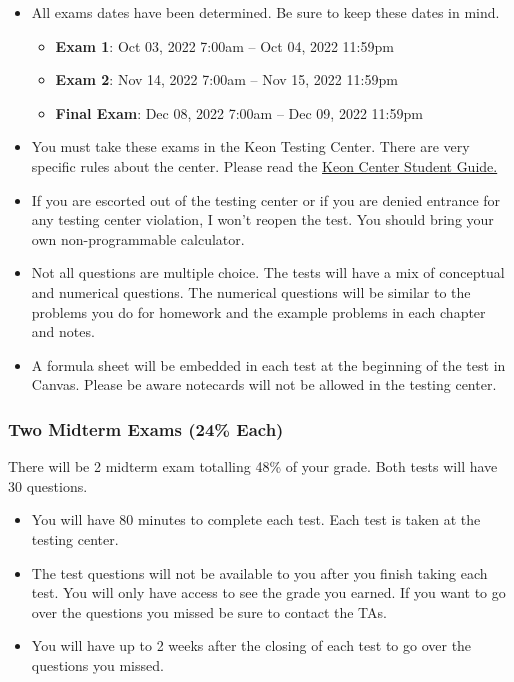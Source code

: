 \documentclass[11pt]{paper}
\begin{document}
\begin{itemize}

\item All exams dates have been determined. Be sure to keep these dates in mind.

\begin{itemize}
  \item \textbf{Exam 1}: Oct 03, 2022 7:00am -- Oct 04, 2022 11:59pm
  \item \textbf{Exam 2}: Nov 14, 2022 7:00am -- Nov 15, 2022 11:59pm
  \item \textbf{Final Exam}: Dec 08, 2022 7:00am -- Dec 09, 2022 11:59pm
\end{itemize}

\item You must take these exams in the Keon Testing Center. There are very specific rules about the center. Please read the \href{https://business.ucf.edu/centers-institutes/keon-testing-center/ktc-student-guide/}{Keon Center Student Guide.}

\item If you are escorted out of the testing center or if you are denied entrance for any testing center violation, I won’t reopen the test. You should bring your own non-programmable calculator.

\item Not all questions are multiple choice. The tests will have a mix of conceptual and numerical questions. The numerical questions will be similar to the problems you do for homework and the example problems in each chapter and notes. 

\item A formula sheet will be embedded in each test at the beginning of the test in Canvas. Please be aware notecards will not be allowed in the testing center.

\end{itemize}

\subsubsection{Two Midterm Exams (24\% Each)}

There will be 2 midterm exam totalling 48\% of your grade. Both tests will have 30 questions. 

\begin{itemize}
\item You will have 80 minutes to complete each test. Each test is taken at the testing center.
\item The test questions will not be available to you after you finish taking each test. You will only have access to see the grade you earned. If you want to go over the questions you missed be sure to contact the TAs.
\item You will have up to 2 weeks after the closing of each test to go over the questions you missed.

\end{itemize}
\end{document}
